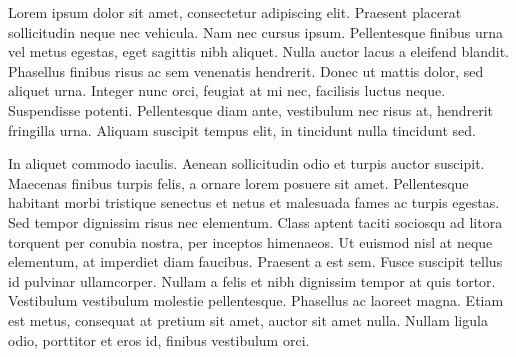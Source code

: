 Lorem ipsum dolor sit amet, consectetur adipiscing elit. Praesent placerat sollicitudin neque nec vehicula. Nam nec cursus ipsum. Pellentesque finibus urna vel metus egestas, eget sagittis nibh aliquet. Nulla auctor lacus a eleifend blandit. Phasellus finibus risus ac sem venenatis hendrerit. Donec ut mattis dolor, sed aliquet urna. Integer nunc orci, feugiat at mi nec, facilisis luctus neque. Suspendisse potenti. Pellentesque diam ante, vestibulum nec risus at, hendrerit fringilla urna. Aliquam suscipit tempus elit, in tincidunt nulla tincidunt sed.

In aliquet commodo iaculis. Aenean sollicitudin odio et turpis auctor suscipit. Maecenas finibus turpis felis, a ornare lorem posuere sit amet. Pellentesque habitant morbi tristique senectus et netus et malesuada fames ac turpis egestas. Sed tempor dignissim risus nec elementum. Class aptent taciti sociosqu ad litora torquent per conubia nostra, per inceptos himenaeos. Ut euismod nisl at neque elementum, at imperdiet diam faucibus. Praesent a est sem. Fusce suscipit tellus id pulvinar ullamcorper. Nullam a felis et nibh dignissim tempor at quis tortor. Vestibulum vestibulum molestie pellentesque. Phasellus ac laoreet magna. Etiam est metus, consequat at pretium sit amet, auctor sit amet nulla. Nullam ligula odio, porttitor et eros id, finibus vestibulum orci.